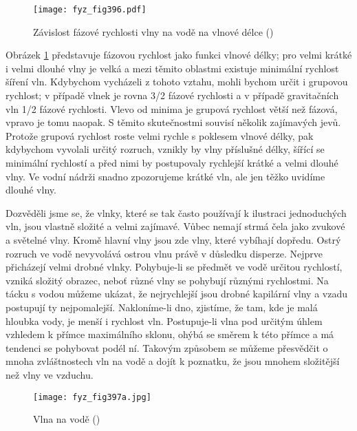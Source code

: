 {  \begin{figure}[ht!] %
    \centering
    \texttt{[image: fyz\_fig396.pdf]}
    \caption{Závislost fázové rychlosti vlny na vodě na vlnové délce
             (\cite[s.~697]{Feynman01})}
    \label{fyz:fig396}
  \end{figure}
  Obrázek \ref{fyz:fig396} představuje fázovou rychlost jako funkci vlnové délky; pro velmi krátké 
  i velmi dlouhé vlny je velká a mezi těmito oblastmi existuje minimální rychlost šíření vln. 
  Kdybychom vycházeli z tohoto vztahu, mohli bychom určit i grupovou rychlost; v případě vlnek je 
  rovna \num{3/2} fázové rychlosti a v případě gravitačních vln \num{1/2} fázové rychlosti. Vlevo 
  od minima je grupová rychlost větší  než fázová, vpravo je tomu naopak. S těmito skutečnostmi 
  souvisí několik zajímavých jevů. Protože grupová rychlost roste velmi rychle s poklesem vlnové 
  délky, pak kdybychom vyvolali určitý rozruch, vznikly by vlny příslušné délky, šířící se 
  minimální rychlostí a před nimi by postupovaly rychlejší krátké a velmi dlouhé vlny. Ve vodní 
  nádrži snadno zpozorujeme krátké vln, ale jen těžko uvidíme dlouhé vlny. 
  
  Dozvěděli jsme se, že vlnky, které se tak často používají k ilustraci jednoduchých vln, jsou 
  vlastně složité a velmi zajímavé. Vůbec nemají strmá čela jako zvukové a světelné vlny. Kromě 
  hlavní vlny jsou zde vlny, které vybíhají dopředu. Ostrý rozruch ve vodě nevyvolává ostrou vlnu 
  právě v důsledku disperze. Nejprve přicházejí velmi drobné vlnky. Pohybuje-li se předmět ve vodě 
  určitou rychlostí, vzniká složitý obrazec, neboť různé vlny se pohybují různými rychlostmi. Na 
  tácku s vodou můžeme ukázat, že nejrychlejší jsou drobné kapilární vlny a vzadu postupují ty 
  nejpomalejší. Nakloníme-li dno, zjistíme, že tam, kde je malá hloubka vody, je menší i rychlost 
  vln. Postupuje-li vlna pod určitým úhlem vzhledem k přímce maximálního sklonu, ohýbá se směrem k 
  této přímce a má tendenci se pohybovat podél ní. Takovým způsobem se můžeme přesvědčit o mnoha 
  zvláštnostech vln na vodě a dojít k poznatku, že jsou mnohem složitější než vlny ve vzduchu. 


  \begin{figure}[ht!] %
    \centering
    \texttt{[image: fyz\_fig397a.jpg]}
    \caption{Vlna na vodě
             (\cite[s.~697]{Feynman01})}
    \label{fyz:fig397}
  \end{figure}
  
}
